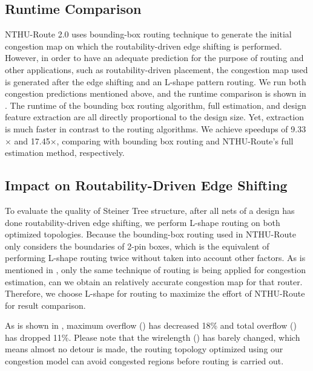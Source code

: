 \subsection{Runtime Comparison}
NTHU-Route 2.0 \cite{NTHU} uses bounding-box routing technique to generate the initial congestion map on which the routability-driven edge shifting is performed.
However, in order to have an adequate prediction for the purpose of routing and other applications, such as routability-driven placement,
the congestion map used is generated after the edge shifting and an L-shape pattern routing.
We run both congestion predictions mentioned above, and the runtime comparison is shown in .
The runtime of the bounding box routing algorithm, full estimation, and design feature extraction are all directly proportional to the design size.
Yet, extraction is much faster in contrast to the routing algorithms.
We achieve speedups of 9.33$\times$ and 17.45$\times$, comparing with bounding box routing and NTHU-Route's full estimation method, respectively.

\subsection{Impact on Routability-Driven Edge Shifting}
To evaluate the quality of Steiner Tree structure, after all nets of a design has done routability-driven edge shifting, we perform L-shape routing on both optimized topologies.
Because the bounding-box routing used in NTHU-Route only considers the boundaries of 2-pin boxes,
which is the equivalent of performing L-shape routing twice without taken into account other factors.
As is mentioned in \cite{fastroute}, only the same technique of routing is being applied for congestion estimation,
can we obtain an relatively accurate congestion map for that router.
Therefore, we choose L-shape for routing to maximize the effort of NTHU-Route for result comparison.

As is shown in , maximum overflow () has decreased 18\% and total overflow () has dropped 11\%.
Please note that the wirelength () has barely changed, which means almost no detour is made,
the routing topology optimized using our congestion model can avoid congested regions before routing is carried out.


